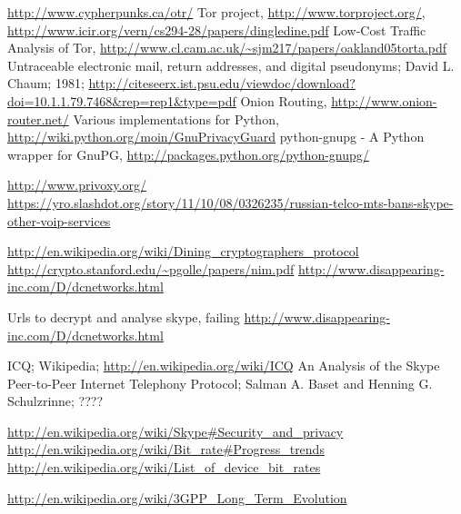 \begin{thebibliography}{666}
 \url{http://www.cypherpunks.ca/otr/}
 Tor project, \url{http://www.torproject.org/},
    \url{http://www.icir.org/vern/cs294-28/papers/dingledine.pdf}
 Low-Cost Traffic Analysis of Tor,
    \url{http://www.cl.cam.ac.uk/~sjm217/papers/oakland05torta.pdf}
 Untraceable electronic mail, return addresses, and digital pseudonyms;
    David L. Chaum; 1981;
    \url{http://citeseerx.ist.psu.edu/viewdoc/download?doi=10.1.1.79.7468&rep=rep1&type=pdf}
 Onion Routing, \url{http://www.onion-router.net/}
 Various implementations for Python,
    \url{http://wiki.python.org/moin/GnuPrivacyGuard}
 python-gnupg - A Python wrapper for GnuPG,
    \url{http://packages.python.org/python-gnupg/}

 \url{http://www.privoxy.org/}
\url{https://yro.slashdot.org/story/11/10/08/0326235/russian-telco-mts-bans-skype-other-voip-services}

\url{http://en.wikipedia.org/wiki/Dining_cryptographers_protocol}
\url{http://crypto.stanford.edu/~pgolle/papers/nim.pdf}
\url{http://www.disappearing-inc.com/D/dcnetworks.html}

 Urls to decrypt and analyse skype, failing
\url{http://www.disappearing-inc.com/D/dcnetworks.html}

 ICQ; Wikipedia;
    \url{http://en.wikipedia.org/wiki/ICQ}
 An Analysis of the Skype Peer-to-Peer Internet
Telephony Protocol;
Salman A. Baset and Henning G. Schulzrinne;
????

 \url{http://en.wikipedia.org/wiki/Skype#Security_and_privacy}
 \url{http://en.wikipedia.org/wiki/Bit_rate#Progress_trends}
 \url{http://en.wikipedia.org/wiki/List_of_device_bit_rates}

 \url{http://en.wikipedia.org/wiki/3GPP_Long_Term_Evolution}



\end{thebibliography}
